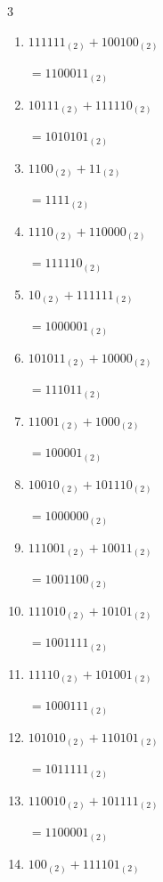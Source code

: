 \begin{multicols}{3}
\begin{enumerate}
        $=11110_{(2)}$

  \item $111111_{(2)} + 100100_{(2)}$

        $=1100011_{(2)}$

  \item $10111_{(2)} + 111110_{(2)}$

        $=1010101_{(2)}$

  \item $1100_{(2)} + 11_{(2)}$

        $=1111_{(2)}$

  \item $1110_{(2)} + 110000_{(2)}$

        $=111110_{(2)}$

\columnbreak %

  \item $10_{(2)} + 111111_{(2)}$

        $=1000001_{(2)}$

  \item $101011_{(2)} + 10000_{(2)}$

        $=111011_{(2)}$

  \item $11001_{(2)} + 1000_{(2)}$

        $=100001_{(2)}$

  \item $10010_{(2)} + 101110_{(2)}$

        $=1000000_{(2)}$

  \item $111001_{(2)} + 10011_{(2)}$

        $=1001100_{(2)}$

  \item $111010_{(2)} + 10101_{(2)}$

        $=1001111_{(2)}$

  \item $11110_{(2)} + 101001_{(2)}$

        $=1000111_{(2)}$

  \item $101010_{(2)} + 110101_{(2)}$

        $=1011111_{(2)}$

  \item $110010_{(2)} + 101111_{(2)}$

        $=1100001_{(2)}$

  \item $100_{(2)} + 111101_{(2)}$


\end{enumerate}
\end{multicols}
